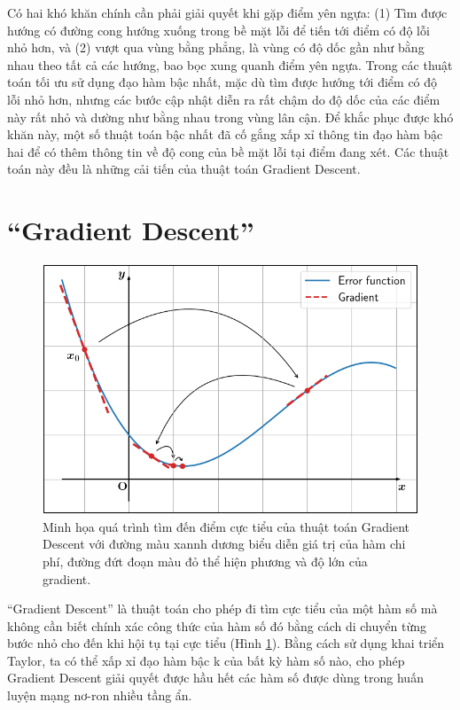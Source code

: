 Có hai khó khăn chính cần phải giải quyết khi gặp điểm yên ngựa: (1) Tìm được hướng có đường cong hướng xuống trong bề mặt lỗi để tiến tới điểm có độ lỗi nhỏ hơn, và (2) vượt qua vùng bằng phẳng, là vùng có độ dốc gần như bằng nhau theo tất cả các hướng, bao bọc xung quanh điểm yên ngựa. Trong các thuật toán tối ưu sử dụng đạo hàm bậc nhất, mặc dù tìm được hướng tới điểm có độ lỗi nhỏ hơn, nhưng các bước cập nhật diễn ra rất chậm do độ dốc của các điểm này rất nhỏ và dường như bằng nhau trong vùng lân cận. Để khắc phục được khó khăn này, một số thuật toán bậc nhất đã cố gắng xấp xỉ thông tin đạo hàm bậc hai để có thêm thông tin về độ cong của bề mặt lỗi tại điểm đang xét. Các thuật toán này đều là những cải tiến của thuật toán Gradient Descent.

\section{``Gradient Descent''}

\begin{figure}[H]
	\centering
	\includegraphics[width=140 mm]{images/gd.png}
	\caption{Minh họa quá trình tìm đến điểm cực tiểu của thuật toán Gradient Descent với đường màu xannh dương biểu diễn giá trị của hàm chi phí, đường đứt đoạn màu đỏ thể hiện phương và độ lớn của gradient.}
	\label{fig:gd}
\end{figure}

``Gradient Descent'' là thuật toán cho phép đi tìm cực tiểu của một hàm số mà không cần biết chính xác công thức của hàm số đó bằng cách di chuyển từng bước nhỏ cho đến khi hội tụ tại cực tiểu (Hình \ref{fig:gd}). Bằng cách sử dụng khai triển Taylor, ta có thể xấp xỉ đạo hàm bậc k của bất kỳ hàm số nào, cho phép Gradient Descent giải quyết được hầu hết các hàm số được dùng trong huấn luyện mạng nơ-ron nhiều tầng ẩn.

